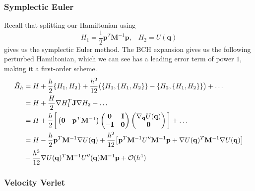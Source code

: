     \subsubsection{Symplectic Euler}

      Recall that splitting our Hamiltonian using 
      \begin{equation}
        H_1 = \frac{1}{2} \mathbf{p}^T \mathbf{M}^{-1} \mathbf{p}, \;\;\; H_2 = U(\mathbf{q})
      \end{equation}
      gives us the symplectic Euler method. The BCH expansion gives us the following perturbed Hamiltonian, which we can see has a leading error term of power $1$, making it a first-order scheme. 
      \begin{align*}
        \Tilde{H}_h & = H + \frac{h}{2} \{H_1, H_2\} + \frac{h^2}{12} \big( \{H_1, \{H_1, H_2\}\} - \{ H_2, \{ H_1, H_2\}\} \big) + \ldots \\
        & = H + \frac{H}{2} \nabla H_1^T \mathbf{J} \nabla H_2 + \ldots \\
        & = H + \frac{h}{2} \bigg[ \begin{pmatrix} \mathbf{0} & \mathbf{p}^T \mathbf{M}^{-1} \end{pmatrix} \begin{pmatrix} \mathbf{0} & \mathbf{I} \\ -\mathbf{I} & \mathbf{0} \end{pmatrix} \begin{pmatrix} \nabla_\mathbf{q} U(\mathbf{q}) \\ \mathbf{0} \end{pmatrix} \bigg] + \ldots \\ 
        & = H - \frac{h}{2} \mathbf{p}^T \mathbf{M}^{-1} \nabla U(\mathbf{q}) + \frac{h^2}{12} \big[ \mathbf{p}^T \mathbf{M}^{-1} U^{\prime\prime} \mathbf{M}^{-1} \mathbf{p} + \nabla U(\mathbf{q})^T \mathbf{M}^{-1} \nabla U(\mathbf{q}) \big] \\
        & - \frac{h^3}{12} \nabla U (\mathbf{q})^T \mathbf{M}^{-1} U^{\prime\prime} (\mathbf{q}) \mathbf{M}^{-1} \mathbf{p} + \mathcal{O}(h^4)
      \end{align*}

    \subsubsection{Velocity Verlet}

